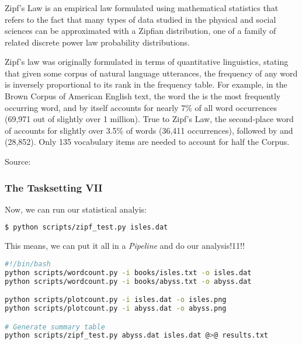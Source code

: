 \begin{frame}
  \frametitle{}
  
Zipf’s Law is an empirical law formulated using mathematical statistics that refers to the fact that many types of data studied in the physical and social sciences can be approximated with a Zipfian distribution, one of a family of related discrete power law probability distributions.

Zipf’s law was originally formulated in terms of quantitative linguistics, stating that given some corpus of natural language utterances, the frequency of any word is inversely proportional to its rank in the frequency table. For example, in the Brown Corpus of American English text, the word the is the most frequently occurring word, and by itself accounts for nearly 7\% of all word occurrences (69,971 out of slightly over 1 million). True to Zipf’s Law, the second-place word of accounts for slightly over 3.5\% of words (36,411 occurrences), followed by and (28,852). Only 135 vocabulary items are needed to account for half the Corpus.

Source: 
\end{frame}

\begin{frame}[fragile]
  \frametitle{The Tasksetting VII}
  Now, we can run our statistical analyis:
  \begin{lstlisting}[language=Bash, style=Shell]
$ python scripts/zipf_test.py isles.dat
  \end{lstlisting}
  \pause
  This means, we can put it all in a \emph{Pipeline} and do our analysis!11!!
  \begin{lstlisting}[language=Bash, style=Shell, basicstyle=\small]
#!/bin/bash
python scripts/wordcount.py -i books/isles.txt -o isles.dat
python scripts/wordcount.py -i books/abyss.txt -o abyss.dat

python scripts/plotcount.py -i isles.dat -o isles.png
python scripts/plotcount.py -i abyss.dat -o abyss.png

# Generate summary table
python scripts/zipf_test.py abyss.dat isles.dat @>@ results.txt
  \end{lstlisting}
\end{frame}

